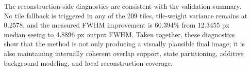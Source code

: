 \documentclass[10pt,twocolumn]{article}
\begin{document}
\noindent
The reconstruction-side diagnostics are consistent with the validation summary. No tile fallback is triggered in any of the 209 tiles, tile-weight variance remains at \num{0.2578}, and the measured FWHM improvement is \num{60.394}\% from \num{12.3455} px median seeing to \num{4.8896} px output FWHM. Taken together, these diagnostics show that the method is not only producing a visually plausible final image; it is also maintaining internally coherent overlap support, state partitioning, additive background modeling, and local reconstruction coverage.
\end{document}
